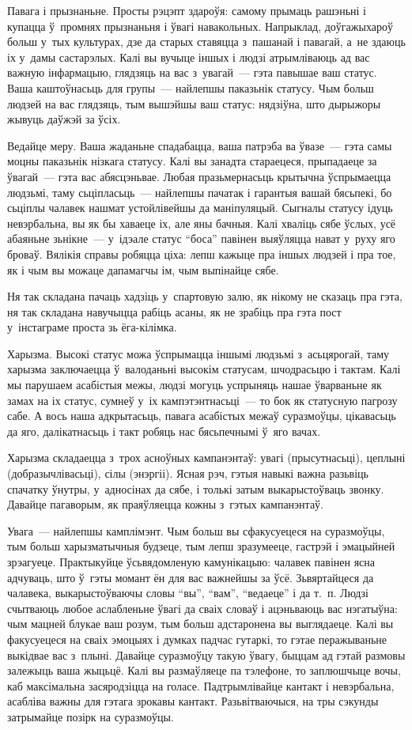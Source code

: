 Павага і прызнаньне. Просты рэцэпт здароўя: самому прымаць рашэньні і купацца ў~промнях прызнаньня і ўвагі навакольных. Напрыклад, доўгажыхароў больш у~тых культурах, дзе да старых ставяцца з~пашанай і павагай, а~не здаюць іх у~дамы састарэлых. Калі вы вучыце іншых і людзі атрымліваюць ад вас важную інфармацыю, глядзяць на вас з~увагай~--- гэта павышае ваш статус. Ваша каштоўнасьць для групы~--- найлепшы паказьнік статусу. Чым больш людзей на вас глядзяць, тым вышэйшы ваш статус: нядзіўна, што дырыжоры жывуць даўжэй за ўсіх.

Ведайце меру. Ваша жаданьне спадабацца, ваша патрэба ва ўвазе~--- гэта самы моцны паказьнік нізкага статусу. Калі вы занадта стараецеся, прыпадаеце за ўвагай~--- гэта вас абясцэньвае. Любая празьмернасьць крытычна ўспрымаецца людзьмі, таму сьціпласьць~--- найлепшы пачатак і гарантыя вашай бясьпекі, бо сьціплы чалавек нашмат устойлівейшы да маніпуляцый. Сыгналы статусу ідуць невэрбальна, вы як бы хаваеце іх, але яны бачныя. Калі хваліць сябе ўслых, усё абаяньне зьнікне~--- у~ідэале статус ``боса'' павінен выяўляцца нават у~руху яго броваў. Вялікія справы робяцца ціха: лепш кажыце пра іншых людзей і пра тое, як і чым вы можаце дапамагчы ім, чым выпінайце сябе.

Ня так складана пачаць хадзіць у~спартовую залю, як нікому не сказаць пра гэта, ня так складана навучыцца рабіць асаны, як не зрабіць пра гэта пост у~інстаграме проста зь ёга-кілімка.

Харызма. Высокі статус можа ўспрымацца іншымі людзьмі з~асьцярогай, таму харызма заключаецца ў~валоданьні высокім статусам, шчодрасьцю і тактам. Калі мы парушаем асабістыя межы, людзі могуць успрыняць нашае ўварваньне як замах на іх статус, сумнеў у~іх кампэтэнтнасьці~--- то бок як статусную пагрозу сабе. А вось наша адкрытасьць, павага асабістых межаў суразмоўцы, цікавасьць да яго, далікатнасьць і такт робяць нас бясьпечнымі ў~яго вачах.

Харызма складаецца з~трох асноўных кампанэнтаў: увагі (прысутнасьці), цеплыні (добразычлівасьці), сілы (энэргіі). Ясная рэч, гэтыя навыкі важна разьвіць спачатку ўнутры, у~адносінах да сябе, і толькі затым выкарыстоўваць звонку. Давайце пагаворым, як праяўляецца кожны з~гэтых кампанэнтаў.

Увага~--- найлепшы камплімэнт. Чым больш вы сфакусуецеся на суразмоўцы, тым больш харызматычныя будзеце, тым лепш зразумееце, гастрэй і эмацыйней зрэагуеце. Практыкуйце ўсьвядомленую камунікацыю: чалавек павінен ясна адчуваць, што ў~гэты момант ён для вас важнейшы за ўсё. Зьвяртайцеся да чалавека, выкарыстоўваючы словы ``вы'', ``вам'', ``ведаеце'' і да т.~п. Людзі счытваюць любое аслабленьне ўвагі да сваіх словаў і ацэньваюць вас нэгатыўна: чым мацней блукае ваш розум, тым больш адстаронена вы выглядаеце. Калі вы факусуецеся на сваіх эмоцыях і думках падчас гутаркі, то гэтае перажываньне выкідвае вас з~плыні. Давайце суразмоўцу такую ўвагу, быццам ад гэтай размовы залежыць ваша жыцьцё. Калі вы размаўляеце па тэлефоне, то заплюшчыце вочы, каб максімальна засяродзіцца на голасе. Падтрымлівайце кантакт і невэрбальна, асабліва важны для гэтага зрокавы кантакт. Разьвітваючыся, на тры сэкунды затрымайце позірк на суразмоўцы.

